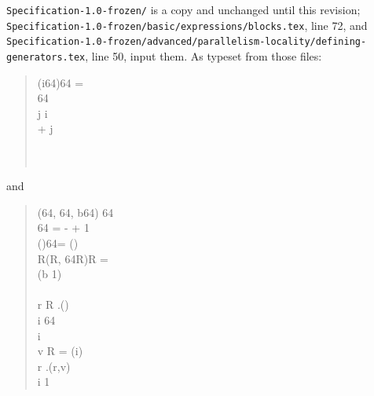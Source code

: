 \begin{description}
\nolinkurl{Specification-1.0-frozen/} is a copy and unchanged until this
revision;
\nolinkurl{Specification-1.0-frozen/basic/expressions/blocks.tex}, line 72,
and \nolinkurl{Specification-1.0-frozen/advanced/parallelism-locality/defining-generators.tex},
line 50, input them. As typeset from those files:
\begin{quote}
\begin{FortressCode}
(i\COLON{}64)\COLON{}64 =\;  \\
\2\+\COLON{}64  \\
   j \COLONOP{}i  \\
  \2\+ \ASSIGN {} + j\- \\
   \\
  \- \\
\end{FortressCode}
\end{quote}
and
\begin{quote}
\begin{FortressCode}
 (\COLON {}64, \COLON {}64, b\COLON {}64)  \llbracket{}64\rrbracket \\
\2\+ \COLONOP {}64 =  -  + 1 \\
  ()\COLON {}\llbracket{}64\rrbracket = (\COLONOP{}) \\
  \llbracket{}R\rrbracket\bigl(\COLON {}\llbracket{}R\rrbracket, \COLON {}64\rightarrow{}R\bigr)\COLON R = \\
  \2\+  \leq (b  1)  \\
    \2\+ \\
      r \COLONOP R \ASSIGN {}.(\ultrathin) \\
      i \COLONOP {}64 \ASSIGN {} \\
       i \leq {}  \\
      \2\+v \COLONOP R = (i) \\
        r \ASSIGN {}.(r,v) \\
        i \mathrel{\mathrel{+}=} 1\- \\

\end{FortressCode}
\end{quote}
\end{description}
